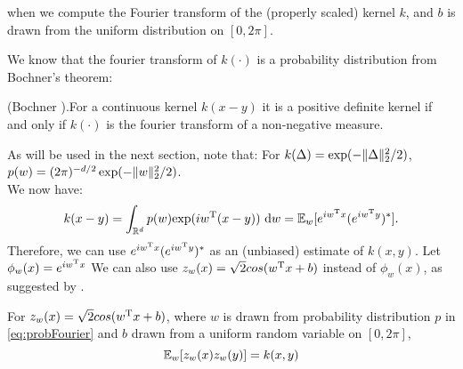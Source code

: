 \documentclass[twoside]{memoir}
\begin{document}
when we compute the Fourier transform of the (properly scaled) kernel $k$, and $b$ is drawn from the uniform distribution on $[0, 2\pi]$.

We know that the fourier transform of $k(\cdot)$ is a probability distribution from Bochner's theorem:
\begin{thm} \label{thm:Bochner}
	(Bochner \cite{Rudin_1990}).For a continuous kernel $k(x - y)$  it is a positive definite kernel if and only if $k(\cdot)$ is the fourier transform of a non-negative measure.
\end{thm}
As will be used in the next section, note that: For $k(\Delta) = \exp(- \lVert\Delta\rVert_2^2 /2)$, $p(w) = (2\pi)^{-d/2} \exp(-\lVert w\rVert_2^2/2)$.\\
We now have:
\[ k(x - y) = \int_{\mathbb{R}^d} p(w) \text{exp}(iw^{\text{T}}(x - y)) ~ \text{d}w = \mathbb{E}_w[e^{iw^{\text{T}}x}(e^{iw^{\text{T}}y})^*]. \]
Therefore, we can use $e^{iw^{\text{T}}x}(e^{iw^{\text{T}}y})^*$ as an (unbiased) estimate of $k(x, y)$.
Let $\phi_w(x) = e^{iw^{\text{T}}x}$
We can also use $z_w(x) = \sqrt{2}cos(w^{\text{T}}x + b)$ instead of $\phi_w(x)$, as suggested by \cite{RFF_Rahimi}.
\begin{prop}
	For $z_w(x) = \sqrt{2}cos(w^{\text{T}}x + b)$, where $w$ is drawn from probability distribution $p$ in \eqref{eq:probFourier} and $b$ drawn from a uniform random variable on $[0, 2\pi]$,
	\[\mathbb{E}_w[z_w(x) z_w(y)] = k(x,y)\]
\end{prop}
\end{document}
